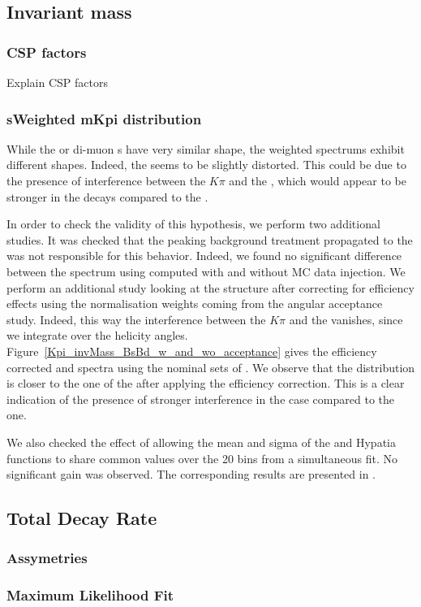 \subsection{\Kpi Invariant mass}
\label{Kpi_Invariant_mass}

\subsubsection{CSP factors}
Explain CSP factors\\

\subsubsection{sWeighted mKpi distribution}
While the \Bs or \Bd di-muon \sPlot s have very similar shape, the \mkpi weighted spectrums exhibit different shapes. 
Indeed, the \Bs \mkpi \sPlot seems to be slightly distorted. This could be due to the presence of interference between
 the $K\pi$ \swave and the \Kstarz, which would appear to be stronger in the \Bs decays compared to the \Bd. 

In order to check the validity of this hypothesis, we perform two additional studies. 
It was checked that the peaking background treatment propagated to the \sWeights was not responsible for this behavior.
Indeed, we found no significant difference between the \Bs \mkpi spectrum using \sWeights computed with and without MC 
data injection. We perform an additional study looking at the \mkpi structure after correcting for efficiency effects 
using the normalisation weights coming from the angular acceptance study. Indeed, this way the interference between the 
$K\pi$ \swave and the \Kstarz \pwave vanishes, since we integrate over the helicity angles. Figure~\ref{Kpi_invMass_BsBd_w_and_wo_acceptance}
 gives the efficiency corrected \Bs and \Bd \mkpi spectra using the nominal sets of \sWeights. We observe that the \Bs \mkpi distribution
 is closer to the one of the \Bd after applying the efficiency correction. This is a clear indication of the presence of stronger interference 
in the \Bs case compared to the \Bd one. 

We also checked the effect of allowing the mean and sigma of the \Bs and \Bd Hypatia functions to share common values over the 20 bins from
a simultaneous fit. No significant gain was observed. The corresponding results are presented in . 


\subsection{Total Decay Rate}
\label{Total_Decay_Rate}

\subsubsection{\CP Assymetries}

\subsubsection{Maximum Likelihood Fit}


